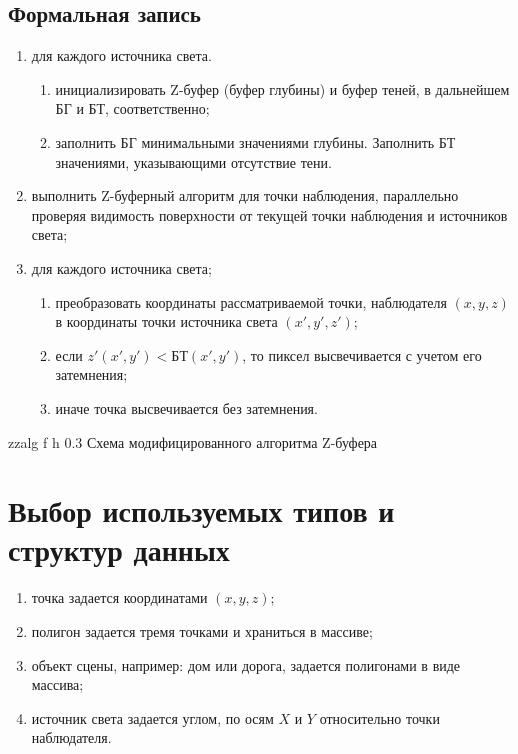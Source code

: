 \subsection{Формальная запись}

\begin{enumerate}
	\item для каждого источника света.
	
	\begin{enumerate}[label=\arabic{enumi}.\arabic*]
		\item инициализировать Z-буфер (буфер глубины)  и буфер теней, в дальнейшем БГ и БТ, соответственно;
		\item заполнить БГ минимальными значениями глубины.
		Заполнить БТ значениями, указывающими отсутствие тени.
	\end{enumerate}
	
	\item выполнить Z-буферный алгоритм для точки наблюдения, параллельно проверяя видимость поверхности от текущей точки наблюдения и источников света;
	\item для каждого источника света;
	
	\begin{enumerate}[label=\arabic{enumi}.\arabic*]
		\item преобразовать координаты рассматриваемой точки, наблюдателя $(x, y, z)$ в координаты точки источника света $(x', y', z')$;
		\item если $z'(x', y') < БТ(x', y')$, то пиксел высвечивается с учетом его затемнения;
		\item  иначе точка высвечивается без затемнения.
	\end{enumerate}
	
	
\end{enumerate}


	{zzalg} %
	{f} %
	{h} %
	{0.3\textwidth} %
	{Схема модифицированного алгоритма Z-буфера} %

\clearpage


\section{Выбор используемых типов и структур данных}


\begin{enumerate}
	\item точка задается координатами $(x, y, z)$;
	\item полигон задается тремя точками и храниться в массиве;
	\item объект сцены, например: дом или дорога, задается полигонами в виде массива;
	\item источник света задается углом, по осям $X$ и $Y$ относительно точки наблюдателя. 
\end{enumerate}



